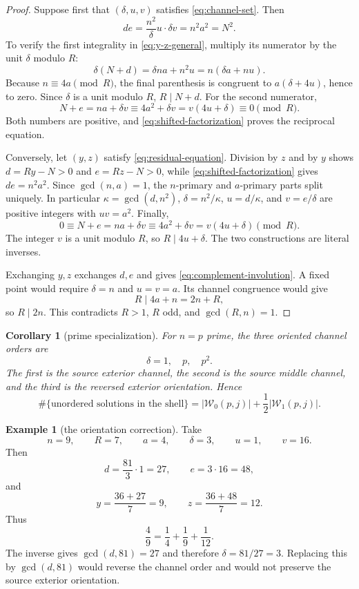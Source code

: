 \documentclass[11pt]{article}
\newtheorem{corollary}[theorem]{Corollary}
\theoremstyle{definition}
\newtheorem{example}[theorem]{Example}
\theoremstyle{remark}
\newcommand{\1}{\mathbf 1}
\begin{document}
\begin{proof}
Suppose first that $(\delta,u,v)$ satisfies \eqref{eq:channel-set}.  Then
\[
 de=\frac{n^2}{\delta}u\cdot\delta v=n^2a^2=N^2.
\]
To verify the first integrality in \eqref{eq:y-z-general}, multiply its
numerator by the unit $\delta$ modulo $R$:
\[
 \delta(N+d)=\delta na+n^2u
 =n(\delta a+nu).
\]
Because $n\equiv4a\pmod R$, the final parenthesis is congruent to
$a(\delta+4u)$, hence to zero.  Since $\delta$ is a unit modulo $R$,
$R\mid N+d$.  For the second numerator,
\[
 N+e=na+\delta v\equiv4a^2+\delta v
 =v(4u+\delta)\equiv0\pmod R.
\]
Both numbers are positive, and \eqref{eq:shifted-factorization} proves the
reciprocal equation.

Conversely, let $(y,z)$ satisfy \eqref{eq:residual-equation}.  Division by
$z$ and by $y$ shows $d=Ry-N>0$ and $e=Rz-N>0$, while
\eqref{eq:shifted-factorization} gives $de=n^2a^2$.  Since $\gcd(n,a)=1$,
the $n$-primary and $a$-primary parts split uniquely.  In particular
$\kappa=\gcd(d,n^2)$, $\delta=n^2/\kappa$, $u=d/\kappa$, and $v=e/\delta$
are positive integers with $uv=a^2$.  Finally,
\[
 0\equiv N+e=na+\delta v\equiv4a^2+\delta v
 =v(4u+\delta)\pmod R.
\]
The integer $v$ is a unit modulo $R$, so $R\mid4u+\delta$.  The two
constructions are literal inverses.

Exchanging $y,z$ exchanges $d,e$ and gives \eqref{eq:complement-involution}.
A fixed point would require $\delta=n$ and $u=v=a$.  Its channel congruence
would give
\[
 R\mid4a+n=2n+R,
\]
so $R\mid2n$.  This contradicts $R>1$, $R$ odd, and $\gcd(R,n)=1$.
\end{proof}

\begin{corollary}[prime specialization]\label{cor:prime-specialization}
For $n=p$ prime, the three oriented channel orders are
\begin{equation}\label{eq:prime-deltas}
 \delta=1,\quad p,\quad p^2.
\end{equation}
The first is the source exterior channel, the second is the source middle
channel, and the third is the reversed exterior orientation.  Hence
\begin{equation}\label{eq:prime-count}
 \#\{\text{unordered solutions in the shell}\}
 =|\mathcal W_0(p,j)|+\frac12|\mathcal W_1(p,j)|.
\end{equation}
\end{corollary}

\begin{example}[the orientation correction]\label{ex:n9}
Take
\[
 n=9,\qquad R=7,\qquad a=4,\qquad \delta=3,
 \qquad u=1,\qquad v=16.
\]
Then
\[
 d=\frac{81}{3}\cdot1=27,\qquad e=3\cdot16=48,
\]
and
\[
 y=\frac{36+27}{7}=9,\qquad z=\frac{36+48}{7}=12.
\]
Thus
\[
 \frac49=\frac14+\frac19+\frac1{12}.
\]
The inverse gives $\gcd(d,81)=27$ and therefore
$\delta=81/27=3$.  Replacing this by $\gcd(d,81)$ would reverse the channel
order and would not preserve the source exterior orientation.
\end{example}
\end{document}
